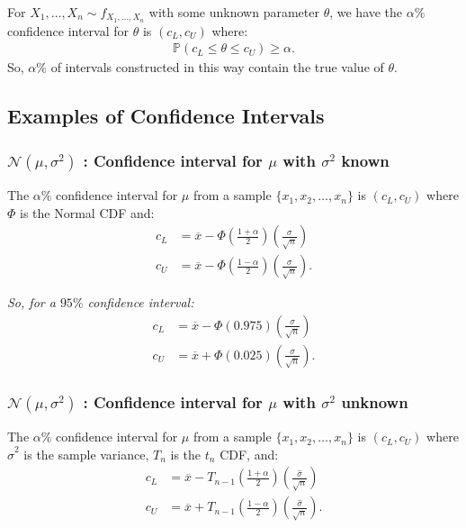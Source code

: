 \documentclass[a4paper, 12pt, twoside]{article}
\begin{document}
For $X_1, \ldots, X_n \sim f_{X_1, \ldots, X_n}$ with some unknown
parameter $\theta$, we have the $\alpha\%$ confidence interval 
for $\theta$ is $(c_L, c_U)$ where:
\begin{align*}
    \mathbb{P}(c_L \leq \theta \leq c_U) \geq \alpha.
\end{align*}
So, $\alpha\%$ of intervals constructed in this way contain the
true value of $\theta$.

\subsection{Examples of Confidence Intervals}

\subsubsection{$\mathcal{N}(\mu, \sigma^2)$ : Confidence 
interval for $\mu$ with $\sigma^2$ known}

The $\alpha\%$ confidence interval for $\mu$ from a sample 
$\{x_1, x_2, \ldots, x_n\}$ is $(c_L, c_U)$ where $\Phi$ is the
Normal CDF and:
\begin{align*}
    c_L &= \overline{x} - \Phi\left(\frac{1 + \alpha}{2}\right)
    \left(\frac{\sigma}{\sqrt{n}}\right) \\
    c_U &= \overline{x} - \Phi\left(\frac{1 - \alpha}{2}\right)
    \left(\frac{\sigma}{\sqrt{n}}\right).
\end{align*}

\textit{So, for a $95\%$ confidence interval:}
\begin{align*}
    c_L &= \overline{x} - \Phi\left(0.975\right)
    \left(\frac{\sigma}{\sqrt{n}}\right) \\
    c_U &= \overline{x} + \Phi\left(0.025\right)
    \left(\frac{\sigma}{\sqrt{n}}\right).
\end{align*}

\subsubsection{$\mathcal{N}(\mu, \sigma^2)$ : Confidence 
interval for $\mu$ with $\sigma^2$ unknown}

The $\alpha\%$ confidence interval for $\mu$ from a sample 
$\{x_1, x_2, \ldots, x_n\}$ is $(c_L, c_U)$ where $\hat\sigma^2$ is
the sample variance, $T_{n}$ is the $t_{n}$ CDF, and:
\begin{align*}
    c_L &= \overline{x} - T_{n-1}\left(\frac{1 + \alpha}{2}\right)
    \left(\frac{\hat\sigma}{\sqrt{n}}\right) \\
    c_U &= \overline{x} + T_{n-1}\left(\frac{1 - \alpha}{2}\right)
    \left(\frac{\hat\sigma}{\sqrt{n}}\right).
\end{align*}
\end{document}
